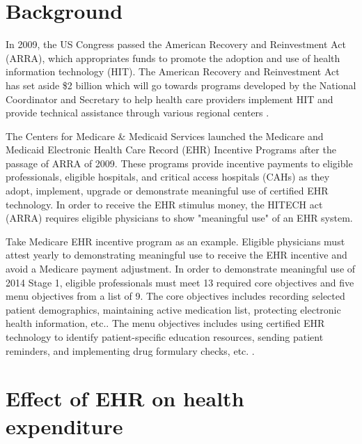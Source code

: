 \documentclass[12pt]{report}
\begin{document}
\section{Background}

In 2009, the US Congress passed the American Recovery and Reinvestment Act (ARRA), which appropriates funds to promote the adoption and use of health information technology (HIT). The American Recovery and Reinvestment Act has set aside \$2 billion which will go towards programs developed by the National Coordinator and Secretary to help health care providers implement HIT and provide technical assistance through various regional centers \citep{hhs_recovery}.

The Centers for Medicare \& Medicaid Services launched the Medicare and Medicaid Electronic Health Care Record (EHR) Incentive Programs after the passage of ARRA of 2009. These programs provide incentive payments to eligible professionals, eligible hospitals, and critical access hospitals (CAHs) as they adopt, implement, upgrade or demonstrate meaningful use of certified EHR technology. In order to receive the EHR stimulus money, the HITECH act (ARRA) requires eligible physicians to show "meaningful use" of an EHR system.

Take Medicare EHR incentive program as an example. Eligible physicians must attest yearly to demonstrating meaningful use to receive the EHR incentive and avoid a Medicare payment adjustment. In order to demonstrate meaningful use of 2014 Stage 1, eligible professionals must meet 13 required core objectives and five menu objectives from a list of 9. The core objectives includes recording selected patient demographics, maintaining active medication list, protecting electronic health information, etc.. The menu objectives includes using certified EHR technology to identify patient-specific education resources, sending patient reminders, and implementing drug formulary checks, etc. \citep{stage1}.

\section{Effect of EHR on health expenditure}
\end{document}
